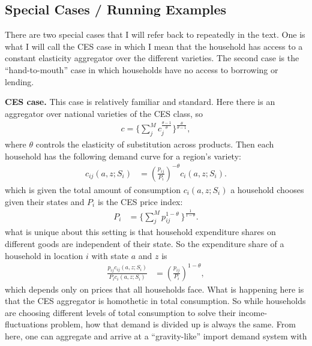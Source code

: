 \documentclass[12pt,pdftex]{article}
\begin{document}
\begin{onehalfspacing}
\newpage



\subsection{Special Cases / Running Examples}

There are two special cases that I will refer back to repeatedly in the text. One is what I will call the CES case in which I mean that the household has access to a constant elasticity aggregator over the different varieties. The second case is the ``hand-to-mouth'' case in which households have no access to borrowing or lending.

\textbf{CES case.} This case is relatively familiar and standard. Here there is an aggregator over national varieties of the CES class, so
\begin{align}
c = \bigg \{ \sum_{j}^{M}  c_{j}^{\frac{\theta - 1}{\theta}} \bigg \}^{\frac{\theta}{\theta - 1}},
\label{eq:ces-armington}
\end{align}
where $\theta$ controls the elasticity of substitution across products. Then each household has the following demand curve for a region's variety:
\begin{align}
c_{ij}(a,z; S_i) & = \left(\frac{p_{ij}}{P_i}\right)^{-\theta}c_{i}(a,z; S_i).
\label{eq:ces-demand-curve}
\end{align}
which is given the total amount of consumption $c_{i}(a,z; S_i)$ a household chooses given their states and $P_i$ is the CES price index:
\begin{align}
P_{i} &= \bigg \{ \sum_{j}^{M} p_{ij}^{1 - \theta} \ \bigg \}^{\frac{1}{1-\theta}}.
\label{eq:ces-price-index}
\end{align}
what is unique about this setting is that household expenditure shares on different goods are independent of their state. So the expenditure share of a household in location $i$ with state $a$ and $z$ is
\begin{align}
\frac{p_{ij}c_{ij}(a,z; S_i)}{P_i c_{i}(a,z; S_i)} & = \left(\frac{p_{ij}}{P_i}\right)^{1-\theta},
\label{eq:ces-expenditure-share}
\end{align}
which depends only on prices that all households face. What is happening here is that the CES aggregator is homothetic in total consumption. So while households are choosing different levels of total consumption to solve their income-fluctuations problem, how that demand is divided up is always the same. From here, one can aggregate and arrive at a ``gravity-like'' import demand system with

\end{onehalfspacing}
\end{document}
